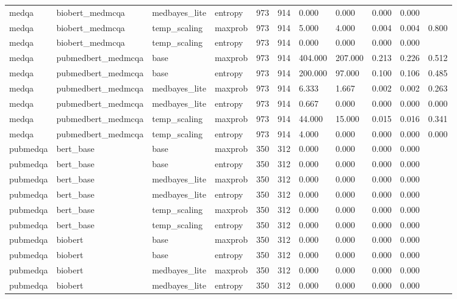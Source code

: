 \begin{table}[htbp]
\begin{tabular}{lllllllllll}
medqa & biobert\_medmcqa & medbayes\_lite & entropy & 973 & 914 & 0.000 & 0.000 & 0.000 & 0.000 &  \\
medqa & biobert\_medmcqa & temp\_scaling & maxprob & 973 & 914 & 5.000 & 4.000 & 0.004 & 0.004 & 0.800 \\
medqa & biobert\_medmcqa & temp\_scaling & entropy & 973 & 914 & 0.000 & 0.000 & 0.000 & 0.000 &  \\
medqa & pubmedbert\_medmcqa & base & maxprob & 973 & 914 & 404.000 & 207.000 & 0.213 & 0.226 & 0.512 \\
medqa & pubmedbert\_medmcqa & base & entropy & 973 & 914 & 200.000 & 97.000 & 0.100 & 0.106 & 0.485 \\
medqa & pubmedbert\_medmcqa & medbayes\_lite & maxprob & 973 & 914 & 6.333 & 1.667 & 0.002 & 0.002 & 0.263 \\
medqa & pubmedbert\_medmcqa & medbayes\_lite & entropy & 973 & 914 & 0.667 & 0.000 & 0.000 & 0.000 & 0.000 \\
medqa & pubmedbert\_medmcqa & temp\_scaling & maxprob & 973 & 914 & 44.000 & 15.000 & 0.015 & 0.016 & 0.341 \\
medqa & pubmedbert\_medmcqa & temp\_scaling & entropy & 973 & 914 & 4.000 & 0.000 & 0.000 & 0.000 & 0.000 \\
pubmedqa & bert\_base & base & maxprob & 350 & 312 & 0.000 & 0.000 & 0.000 & 0.000 &  \\
pubmedqa & bert\_base & base & entropy & 350 & 312 & 0.000 & 0.000 & 0.000 & 0.000 &  \\
pubmedqa & bert\_base & medbayes\_lite & maxprob & 350 & 312 & 0.000 & 0.000 & 0.000 & 0.000 &  \\
pubmedqa & bert\_base & medbayes\_lite & entropy & 350 & 312 & 0.000 & 0.000 & 0.000 & 0.000 &  \\
pubmedqa & bert\_base & temp\_scaling & maxprob & 350 & 312 & 0.000 & 0.000 & 0.000 & 0.000 &  \\
pubmedqa & bert\_base & temp\_scaling & entropy & 350 & 312 & 0.000 & 0.000 & 0.000 & 0.000 &  \\
pubmedqa & biobert & base & maxprob & 350 & 312 & 0.000 & 0.000 & 0.000 & 0.000 &  \\
pubmedqa & biobert & base & entropy & 350 & 312 & 0.000 & 0.000 & 0.000 & 0.000 &  \\
pubmedqa & biobert & medbayes\_lite & maxprob & 350 & 312 & 0.000 & 0.000 & 0.000 & 0.000 &  \\
pubmedqa & biobert & medbayes\_lite & entropy & 350 & 312 & 0.000 & 0.000 & 0.000 & 0.000 &  \\

\end{tabular}
\end{table}
